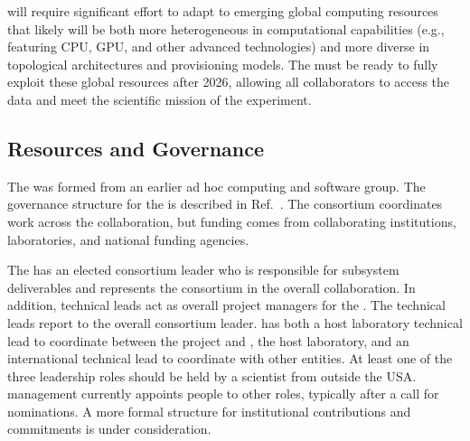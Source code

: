  will require significant effort to adapt to emerging  %
global computing resources that %
  likely will be both more heterogeneous in computational capabilities (e.g., featuring CPU, GPU, and other advanced technologies) and more diverse in topological architectures and provisioning models.  The   must %
be ready to fully exploit these global resources %
after 2026, allowing all collaborators to access the data and meet the scientific mission of the experiment.  

\subsection{Resources and Governance}
\label{sec:exec-comp-res}

The  was formed from an earlier ad hoc  computing and software group. 
The governance structure for the  is described in Ref.~\cite{bib:docdb12751}.  The consortium coordinates work across the collaboration, but funding comes from collaborating institutions, laboratories, and national funding agencies. 

The %
 has an elected consortium leader %
who is responsible for subsystem deliverables and represents the consortium in the overall  collaboration.
In addition, technical leads act as overall project managers for the . The technical leads report to the overall consortium leader.
 has both a host laboratory technical lead to coordinate between the  project and , the host laboratory, 
and an international technical lead to coordinate with other entities.
At least one of the three leadership roles should be held by a scientist from outside the USA. 
 management currently 
appoints people to other roles, typically after a call for nominations.  A more formal structure for institutional contributions and commitments is under consideration. 


